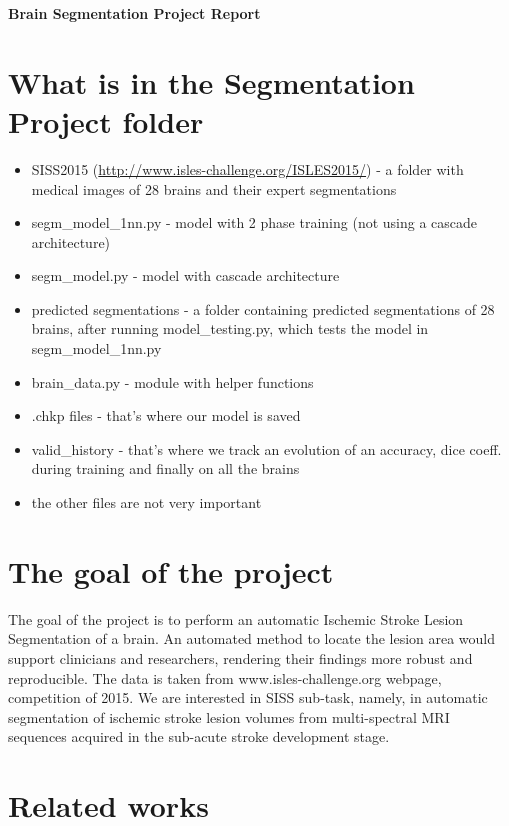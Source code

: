 \documentclass[12pt]{report}
\begin{document}
\begin{center}
      \Large\textbf{Brain Segmentation Project Report}
\end{center}

\section*{What is in the Segmentation Project folder}

\begin{itemize}
  \item {SISS2015 (\url{http://www.isles-challenge.org/ISLES2015/}) - a folder with medical images of 28 brains and their expert segmentations}
  \item {segm\_model\_1nn.py - model with 2 phase training (not using a cascade architecture)}
  \item {segm\_model.py - model with cascade architecture}
  \item {predicted segmentations - a folder containing predicted segmentations of 28 brains, after running model\_testing.py, which tests the model in segm\_model\_1nn.py}
  \item {brain\_data.py - module with helper functions}
  \item {.chkp files - that's where our model is saved}
  \item {valid\_history - that's where we track an evolution of an accuracy, dice coeff. during training and finally on all the brains}
  \item {the other files are not very important}
  
\end{itemize}


\section*{The goal of the project}


The goal of the project is to perform an automatic Ischemic Stroke Lesion Segmentation of a brain. An automated method to locate the lesion area would support clinicians and researchers, rendering their findings more robust and reproducible. The data is taken from www.isles-challenge.org webpage, competition of 2015. We are interested in SISS sub-task, namely, in automatic segmentation of ischemic stroke lesion volumes from multi-spectral MRI sequences acquired in the sub-acute stroke development stage.

\section*{Related works}
\end{document}
